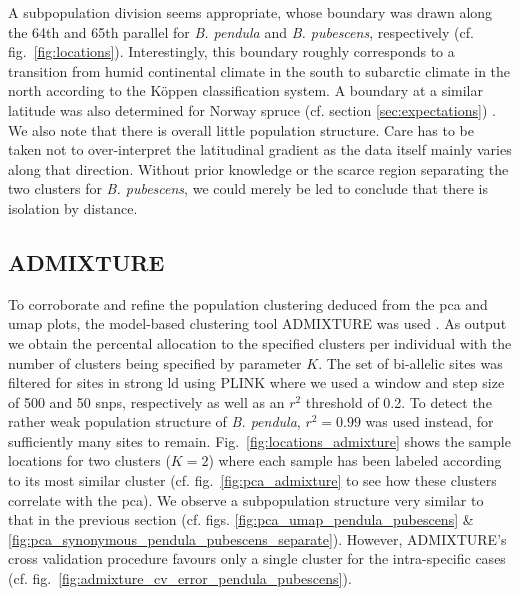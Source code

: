 \documentclass[hidelinks,11pt]{article}
\newcommand{\pendula}{\textit{B. pendula}}
\newcommand{\pubescens}{\textit{B. pubescens}}
\begin{document}
{    A subpopulation division seems appropriate, whose boundary was drawn along the 64th and 65th parallel for \pendula{} and \pubescens{}, respectively (cf. fig.~\ref{fig:locations}). Interestingly, this boundary roughly corresponds to a transition from humid continental climate in the south to subarctic climate in the north according to the Köppen classification system. A boundary at a similar latitude was also determined for Norway spruce (cf. section \ref{sec:expectations}) \cite{spruce-demography}. We also note that there is overall little population structure. Care has to be taken not to over-interpret the latitudinal gradient as the data itself mainly varies along that direction. Without prior knowledge or the scarce region separating the two clusters for \pubescens{}, we could merely be led to conclude that there is isolation by distance.

    \subsection{ADMIXTURE}
    \label{admixture}

    To corroborate and refine the population clustering deduced from the \acrshort{pca} and \acrshort{umap} plots, the model-based clustering tool \mbox{ADMIXTURE} was used \cite{admixture}. As output we obtain the percental allocation to the specified clusters per individual with the number of clusters being specified by parameter $K$. The set of bi-allelic sites was filtered for sites in strong \acrshort{ld} using PLINK where we used a window and step size of 500 and 50 \acrshort{snp}s, respectively as well as an $r^2$ threshold of 0.2. To detect the rather weak population structure of \pendula{}, $r^2=0.99$ was used instead, for sufficiently many sites to remain. Fig.~\ref{fig:locations_admixture} shows the sample locations for two clusters ($K=2$) where each sample has been labeled according to its most similar cluster (cf. fig.~\ref{fig:pca_admixture} to see how these clusters correlate with the \acrshort{pca}). We observe a subpopulation structure very similar to that in the previous section (cf. figs. \ref{fig:pca_umap_pendula_pubescens} \& \ref{fig:pca_synonymous_pendula_pubescens_separate}). However, \mbox{ADMIXTURE}'s cross validation procedure favours only a single cluster for the intra-specific cases (cf. fig.~\ref{fig:admixture_cv_error_pendula_pubescens}).

}
\end{document}

